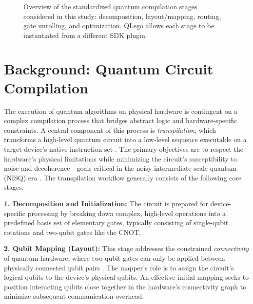 \documentclass[conference]{IEEEtran}
\begin{document}
\begin{figure}[!t]
    \centering
    \caption{Overview of the standardized quantum compilation stages considered in this study: decomposition, layout/mapping, routing, gate unrolling, and optimization. QLego allows each stage to be instantiated from a different SDK plugin.}
    \label{fig:passes}
\end{figure}


\section{Background: Quantum Circuit Compilation}
\label{sec:background}

The execution of quantum algorithms on physical hardware is contingent on a complex compilation process that bridges abstract logic and hardware-specific constraints. A central component of this process is \textit{transpilation}, which transforms a high-level quantum circuit into a low-level sequence executable on a target device's native instruction set \cite{cowtan2019phase}. The primary objectives are to respect the hardware's physical limitations while minimizing the circuit's susceptibility to noise and decoherence—goals critical in the noisy intermediate-scale quantum (NISQ) era \cite{preskill2018quantum}. The transpilation workflow generally consists of the following core stages:

\textbf{1. Decomposition and Initialization:} The circuit is prepared for device-specific processing by breaking down complex, high-level operations into a predefined basis set of elementary gates, typically consisting of single-qubit rotations and two-qubit gates like the CNOT.

\textbf{2. Qubit Mapping (Layout):} This stage addresses the constrained \textit{connectivity} of quantum hardware, where two-qubit gates can only be applied between physically connected qubit pairs \cite{siraichi2018qubit}. The mapper's role is to assign the circuit's logical qubits to the device's physical qubits. An effective initial mapping seeks to position interacting qubits close together in the hardware's connectivity graph to minimize subsequent communication overhead.
\end{document}
